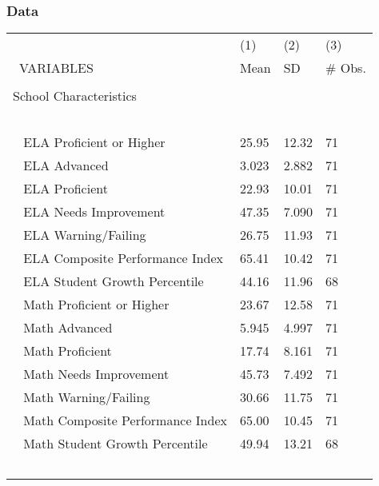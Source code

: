 \documentclass{beamer}
\begin{document}
\begin{frame}
\label{Data: Table of Means}
\frametitle{Data}
\begin{table}[H]
\tiny
{}%
\centering
\begin{tabularx}{\textwidth}{l C C C}\hline
 & (1) & (2) & (3) \\\
VARIABLES & Mean & SD & \# Obs. \\ \hline
 &  &  &  \\
School Characteristics \\\
&&&\\\
\hspace{5mm} ELA Proficient or Higher & 25.95 & 12.32 & 71 \\\
\hspace{5mm} ELA Advanced & 3.023 & 2.882 & 71 \\\
\hspace{5mm} ELA Proficient & 22.93 & 10.01 & 71 \\\
\hspace{5mm} ELA Needs Improvement & 47.35 & 7.090 & 71 \\\
\hspace{5mm} ELA Warning/Failing & 26.75 & 11.93 & 71 \\\
\hspace{5mm} ELA Composite Performance Index & 65.41 & 10.42 & 71 \\\
\hspace{5mm} ELA Student Growth Percentile & 44.16 & 11.96 & 68 \\\
\hspace{5mm} Math Proficient or Higher & 23.67 & 12.58 & 71 \\\
\hspace{5mm} Math Advanced & 5.945 & 4.997 & 71 \\\
\hspace{5mm} Math Proficient & 17.74 & 8.161 & 71 \\\
\hspace{5mm} Math Needs Improvement & 45.73 & 7.492 & 71 \\\
\hspace{5mm} Math Warning/Failing & 30.66 & 11.75 & 71 \\\
\hspace{5mm} Math Composite Performance Index & 65.00 & 10.45 & 71 \\\
\hspace{5mm} Math Student Growth Percentile & 49.94 & 13.21 & 68 \\\

\end{tabularx}
\end{table}
\end{frame}
\end{document}
